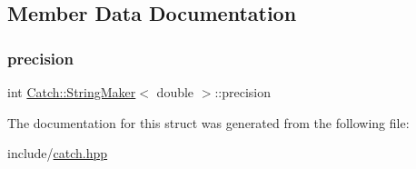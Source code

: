 \subsection{Member Data Documentation}
\mbox{\label{struct_catch_1_1_string_maker_3_01double_01_4_a15fa2b093c532ece7f1d0c713ebaee67}} 
\subsubsection{\texorpdfstring{precision}{precision}}
{\footnotesize\ttfamily int \mbox{\hyperlink{struct_catch_1_1_string_maker}{Catch\+::\+String\+Maker}}$<$ double $>$\+::precision\hspace{0.3cm}{\ttfamily [static]}}



The documentation for this struct was generated from the following file\+:\begin{DoxyCompactItemize}
\item 
include/\mbox{\hyperlink{catch_8hpp}{catch.\+hpp}}\end{DoxyCompactItemize}
